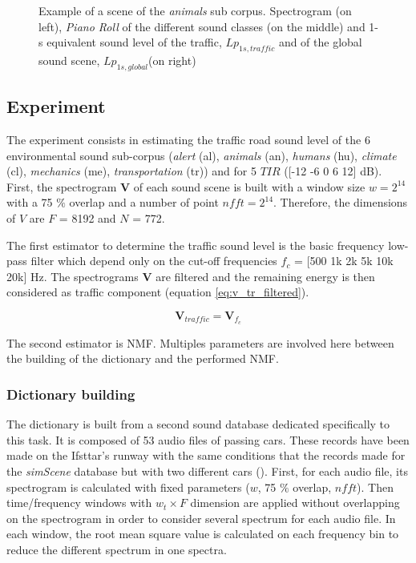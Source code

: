 \documentclass[twocolumn,a4paper,10pt]{article}
\begin{document}
\begin{figure}
\begin{minipage}[c]{.32\linewidth}
   \end{minipage}
\caption{Example of a scene of the \textit{animals} sub corpus. Spectrogram (on left), \textit{Piano Roll} of the different sound classes (on the middle) and 1-s equivalent sound level of the traffic, $Lp_{1s,traffic}$ and of the global sound scene, $Lp_{1s,global}$(on right)}
\label{fig:exampleScene}
\end{figure}

\subsection{Experiment}

The experiment consists in estimating the traffic road sound level of the 6 environmental sound sub-corpus (\textit{alert} (al), \textit{animals} (an), \textit{humans} (hu), \textit{climate} (cl), \textit{mechanics} (me), \textit{transportation} (tr)) and for 5 $TIR$ ([-12 -6 0 6 12] dB). First, the spectrogram $\mathbf{V}$ of each sound scene is built with a window size $w = 2^{14}$ with a 75 $\%$ overlap and a number of point $nfft = 2^{14}$. Therefore, the dimensions of $V$ are $F$ = 8192 and $N$ = 772. 

The first estimator to determine the traffic sound level is the basic frequency low-pass filter which depend only on the cut-off frequencies $f_c$ = [500 1k 2k 5k 10k 20k] Hz. The spectrograms $\mathbf{V}$ are filtered and the remaining energy is then considered as traffic component (equation \ref{eq:v_tr_filtered}). 

\begin{equation}\label{eq:v_tr_filtered}
\mathbf{V}_{traffic} = \mathbf{V}_{f_c}
\end{equation}

The second estimator is NMF. Multiples parameters are involved here between the building of the dictionary and the performed NMF. 

\subsubsection{Dictionary building}
The dictionary is built from a second sound database dedicated specifically to this task. It is composed of 53 audio files of passing cars. These records have been made on the Ifsttar's runway with the same conditions that the records made for the \textit{simScene} database but with two different cars (). First, for each audio file, its spectrogram is calculated with fixed parameters ($w$, 75 $\%$ overlap, $nfft$). Then time/frequency windows with $w_t \times F$ dimension are applied without overlapping on the spectrogram in order to consider several spectrum for each audio file. In each window, the root mean square value is calculated on each frequency bin to reduce the different spectrum in one spectra.  
\end{document}
